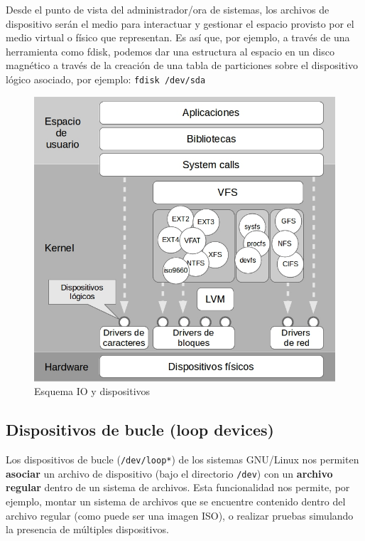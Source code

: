 Desde el punto de vista del administrador/ora de sistemas, los archivos de dispositivo serán el medio para interactuar y gestionar el espacio provisto por el medio virtual o físico que representan. Es así que, por ejemplo, a través de una herramienta como fdisk, podemos dar una estructura al espacio en un disco magnético a través de la creación de una tabla de particiones sobre el dispositivo lógico asociado, por ejemplo: \lstinline$fdisk /dev/sda$ 

\begin{figure}[H]
\begin{center}
        \includegraphics[scale=0.5, angle=0.0]{img/IO.jpg}
        \caption{Esquema IO y dispositivos}
        \label{module}
\end{center}
\end{figure}
\subsection{Dispositivos de bucle (loop devices)}

Los dispositivos de bucle (\lstinline$/dev/loop*$) de los 
sistemas GNU/Linux nos permiten \textbf{asociar} 
un archivo de dispositivo (bajo el directorio \lstinline$/dev$) con un 
\textbf{archivo
regular} dentro de un sistema de archivos. Esta funcionalidad nos permite, por 
ejemplo, montar un sistema de archivos que se encuentre contenido dentro del 
archivo regular (como puede ser una imagen ISO), o realizar pruebas simulando
la presencia de múltiples dispositivos. 

